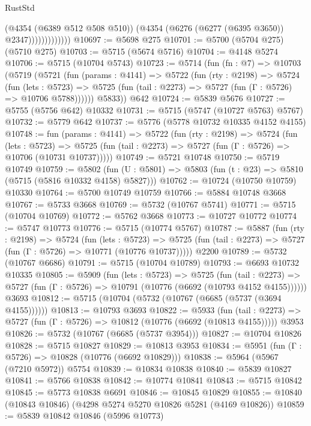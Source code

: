 \begin{lexlean}{RustStd}
\begin{coremodule}
                          (@4354 (@6389 @512 @508 @510))
                          (@4354 (@6276 (@6277 (@6395 @3650)) @2347)))))))))))))
@10697 := @5698 @275
@10701 := @5700 (@5704 @275) (@5710 @275)
@10703 := @5715 (@5674 @5716)
@10704 := @4148 @5274
@10706 := @5715 (@10704 @5743)
@10723 := @5714
    (fun (fn : @7) =>
    @10703
      (@5719
        (@5721
          (fun (params : @4141) =>
          @5722
            (fun (rty : @2198) =>
            @5724
              (fun (lets : @5723) =>
              @5725 (fun (tail : @2273) => @5727 (fun (Γ : @5726) => @10706 @5788))))))
        @5833))
    @642
@10724 := @5839 @5676
@10727 := @5755 (@5756 @642) @10332
@10731 := @5715 (@5747 (@10727 @5763) @5767)
@10732 := @5779 @642
@10737 := @5776 (@5778 @10732 @10335 @4152 @4155)
@10748 := fun (params : @4141) =>
  @5722
    (fun (rty : @2198) =>
    @5724
      (fun (lets : @5723) =>
      @5725 (fun (tail : @2273) => @5727 (fun (Γ : @5726) => @10706 (@10731 @10737)))))
@10749 := @5721 @10748
@10750 := @5719 @10749
@10759 := @5802
    (fun (U : @5801) => @5803 (fun (t : @23) => @5810 (@5715 (@5816 @10332 @4158) @5827)))
@10762 := @10724 (@10750 @10759) @10330
@10764 := @5700 @10749 @10759
@10766 := @5884 @10748 @3668
@10767 := @5733 @3668
@10769 := @5732 (@10767 @5741)
@10771 := @5715 (@10704 @10769)
@10772 := @5762 @3668
@10773 := @10727 @10772
@10774 := @5747 @10773
@10776 := @5715 (@10774 @5767)
@10787 := @5887
    (fun (rty : @2198) =>
    @5724
      (fun (lets : @5723) =>
      @5725 (fun (tail : @2273) => @5727 (fun (Γ : @5726) => @10771 (@10776 @10737)))))
    @2200
@10789 := @5732 (@10767 @6686)
@10791 := @5715 (@10704 @10789)
@10793 := @6693 @10732 @10335
@10805 := @5909
    (fun (lets : @5723) =>
    @5725
      (fun (tail : @2273) =>
      @5727 (fun (Γ : @5726) => @10791 (@10776 (@6692 (@10793 @4152 @4155))))))
    @3693
@10812 := @5715 (@10704 (@5732 (@10767 (@6685 (@5737 (@3694 @4155))))))
@10813 := @10793 @3693
@10822 := @5933
    (fun (tail : @2273) => @5727 (fun (Γ : @5726) => @10812 (@10776 (@6692 (@10813 @4155)))))
    @3953
@10826 := @5732 (@10767 (@6685 (@5737 @3954)))
@10827 := @10704 @10826
@10828 := @5715 @10827
@10829 := @10813 @3953
@10834 := @5951 (fun (Γ : @5726) => @10828 (@10776 (@6692 @10829)))
@10838 := @5964 (@5967 (@7210 @5972)) @5754
@10839 := @10834 @10838
@10840 := @5839 @10827
@10841 := @5766 @10838
@10842 := @10774 @10841
@10843 := @5715 @10842
@10845 := @5773 @10838 @6691
@10846 := @10845 @10829
@10855 := @10840 (@10843 @10846) (@4298 @5274 @5270 @10826 @5281 (@4169 @10826))
@10859 := @5839 @10842 @10846 (@5996 @10773)

\end{coremodule}
\end{lexlean}
